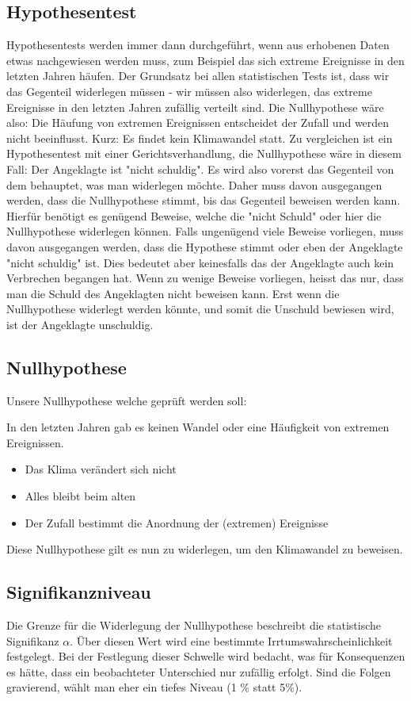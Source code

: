 \begin{refsection}
\section{Hypothesentest}
Hypothesentests werden immer dann durchgeführt, wenn aus erhobenen Daten etwas nachgewiesen werden muss, zum Beispiel das sich extreme Ereignisse in den letzten Jahren häufen. Der Grundsatz bei allen statistischen Tests ist, dass wir das Gegenteil widerlegen müssen - wir müssen also widerlegen, das extreme Ereignisse in den letzten Jahren zufällig verteilt sind. Die Nullhypothese wäre also: Die Häufung von extremen Ereignissen entscheidet der Zufall und werden nicht beeinflusst. Kurz: Es findet kein Klimawandel statt.
Zu vergleichen ist ein Hypothesentest mit einer Gerichtsverhandlung, die Nullhypothese wäre in diesem Fall: Der Angeklagte ist "nicht schuldig". Es wird also vorerst das Gegenteil von dem behauptet, was man widerlegen möchte. Daher muss davon ausgegangen werden, dass die Nullhypothese stimmt, bis das Gegenteil beweisen werden kann. Hierfür benötigt es genügend Beweise, welche die "nicht Schuld" oder hier die Nullhypothese widerlegen können.
Falls ungenügend viele Beweise vorliegen, muss davon ausgegangen werden, dass die Hypothese stimmt oder eben der Angeklagte "nicht schuldig" ist. Dies bedeutet aber keinesfalls das der Angeklagte auch kein Verbrechen begangen hat. Wenn zu wenige Beweise vorliegen, heisst das nur, dass man die Schuld des Angeklagten nicht beweisen kann. Erst wenn die Nullhypothese widerlegt werden könnte, und somit die Unschuld bewiesen wird, ist der Angeklagte unschuldig.


\subsection{Nullhypothese}
Unsere Nullhypothese welche geprüft werden soll:

In den letzten Jahren gab es keinen Wandel oder eine Häufigkeit von extremen Ereignissen.
\begin{itemize}
\item Das Klima verändert sich nicht
\item Alles bleibt beim alten
\item Der Zufall bestimmt die Anordnung der (extremen) Ereignisse
\end{itemize}
%
Diese Nullhypothese gilt es nun zu widerlegen, um den Klimawandel zu beweisen.


\subsection{Signifikanzniveau}
Die Grenze für die Widerlegung der Nullhypothese beschreibt die statistische Signifikanz $\alpha$. Über diesen Wert wird eine bestimmte Irrtumswahrscheinlichkeit festgelegt.
Bei der Festlegung dieser Schwelle wird bedacht, was für Konsequenzen es hätte, dass ein beobachteter Unterschied nur zufällig erfolgt. Sind die Folgen gravierend, wählt man eher ein tiefes Niveau (1 \% statt 5\%).


\end{refsection}
